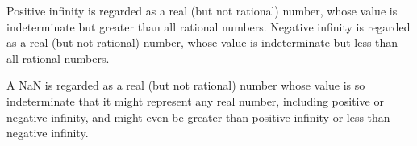 Positive infinity is regarded as a real (but not rational) number,
whose value is indeterminate but greater than all rational numbers.
Negative infinity is regarded as a real (but not rational) number,
whose value is indeterminate but less than all rational numbers.

A NaN is regarded as a real (but not rational) number whose value is
so indeterminate that it might represent any real number, including
positive or negative infinity, and might even be greater than positive
infinity or less than negative infinity.

